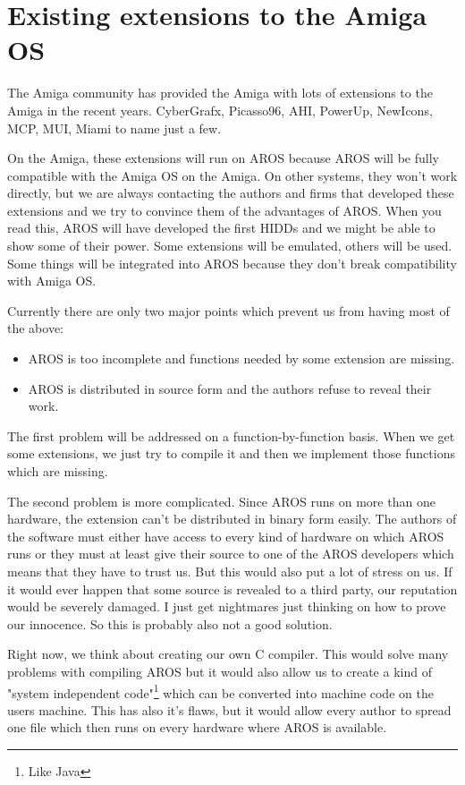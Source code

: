\section{Existing extensions to the Amiga OS}

The Amiga community has provided the Amiga with lots of extensions to the
Amiga in the recent years. CyberGrafx, Picasso96, AHI, PowerUp, NewIcons,
MCP, MUI, Miami to name just a few.

On the Amiga, these extensions will run on AROS because AROS will be fully
compatible with the Amiga OS on the Amiga. On other systems, they won't work
directly, but we are always contacting the authors and firms that developed
these extensions and we try to convince them of the advantages of AROS. When
you read this, AROS will have developed the first HIDDs and we might be
able to show some of their power. Some extensions will be emulated, others
will be used. Some things will be integrated into AROS because they don't
break compatibility with Amiga OS.

Currently there are only two major points which prevent us from having most
of the above:

\begin{itemize}
\item AROS is too incomplete and functions needed by some extension are
missing.

\item AROS is distributed in source form and the authors refuse to reveal
their work.

\end{itemize}

The first problem will be addressed on a function-by-function basis. When we
get some extensions, we just try to compile it and then we implement those
functions which are missing.

The second problem is more complicated. Since AROS runs on more than one
hardware, the extension can't be distributed in binary form easily. The
authors of the software must either have access to every kind of hardware
on which AROS runs or they must at least give their source to one of the
AROS developers which means that they have to trust us. But this would also
put a lot of stress on us. If it would ever happen that some source is
revealed to a third party, our reputation would be severely damaged. I just
get nightmares just thinking on how to prove our innocence. So this is
probably also not a good solution.

Right now, we think about creating our own C compiler. This would solve
many problems with compiling AROS but it would also allow us to create a
kind of "system independent code"\footnote{Like Java} which can be
converted into machine code on the users machine. This has also it's flaws,
but it would allow every author to spread one file which then runs on every
hardware where AROS is available.

